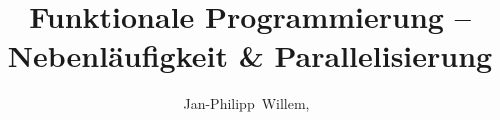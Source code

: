 \documentclass[10pt,journal,compsoc]{IEEEtran}
\begin{document}
%
\title{Funktionale Programmierung -- \\Nebenläufigkeit \& Parallelisierung}
%
%
%
%

\author{Jan-Philipp~Willem,~
}
\end{document}
